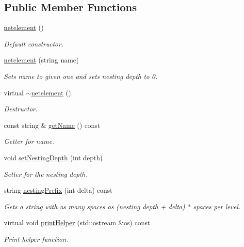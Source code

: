 \subsection*{Public Member Functions}
\begin{DoxyCompactItemize}
\item 
\hyperlink{classnetelement_a3c5679d2661bf66345db1e743bd3b134}{netelement} ()
\begin{DoxyCompactList}\small\item\em Default constructor. \end{DoxyCompactList}\item 
\hyperlink{classnetelement_a3bd01f2c0dba151f0f801ce3a9b64bd6}{netelement} (string name)
\begin{DoxyCompactList}\small\item\em Sets name to given one and sets nesting depth to 0. \end{DoxyCompactList}\item 
virtual \hyperlink{classnetelement_a5a19b5ac59274fe4e7da4588f9368f90}{$\sim$netelement} ()
\begin{DoxyCompactList}\small\item\em Destructor. \end{DoxyCompactList}\item 
const string \& \hyperlink{classnetelement_ae60065a5439cf34e8661a0f69e3a9b0e}{get\-Name} () const 
\begin{DoxyCompactList}\small\item\em Getter for name. \end{DoxyCompactList}\item 
void \hyperlink{classnetelement_a71b9122e5914b097d54453afd5f410dd}{set\-Nesting\-Depth} (int depth)
\begin{DoxyCompactList}\small\item\em Setter for the nesting depth. \end{DoxyCompactList}\item 
string \hyperlink{classnetelement_a6e5f6fd9636b94ecb10d9c60c3a52591}{nesting\-Prefix} (int delta) const 
\begin{DoxyCompactList}\small\item\em Gets a string with as many spaces as (nesting depth + delta) $\ast$ spaces per level. \end{DoxyCompactList}\item 
virtual void \hyperlink{classnetelement_a0763e38cebe07a50be6cfed014619de9}{print\-Helper} (std\-::ostream \&os) const 
\begin{DoxyCompactList}\small\item\em Print helper function. \end{DoxyCompactList}\end{DoxyCompactItemize}


